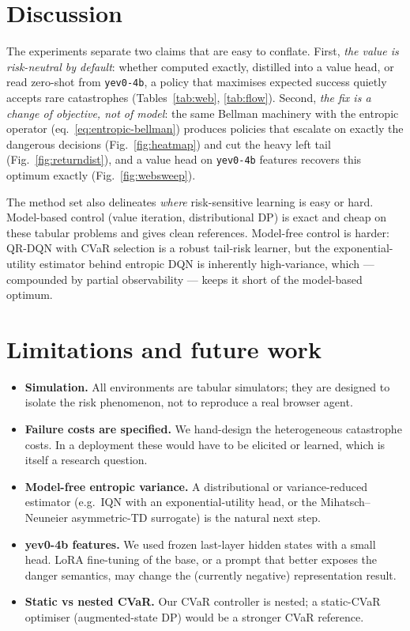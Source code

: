 \documentclass[11pt]{article}
\begin{document}
\section{Discussion}
The experiments separate two claims that are easy to conflate. First,
\emph{the value is risk-neutral by default}: whether computed exactly, distilled
into a value head, or read zero-shot from \texttt{yev0-4b}, a policy that maximises
expected success quietly accepts rare catastrophes (Tables~\ref{tab:web},
\ref{tab:flow}). Second, \emph{the fix is a change of objective, not of model}: the
same Bellman machinery with the entropic operator (eq.~\ref{eq:entropic-bellman})
produces policies that escalate on exactly the dangerous decisions
(Fig.~\ref{fig:heatmap}) and cut the heavy left tail (Fig.~\ref{fig:returndist}),
and a value head on \texttt{yev0-4b} features recovers this optimum exactly
(Fig.~\ref{fig:websweep}).

The method set also delineates \emph{where} risk-sensitive learning is easy or
hard. Model-based control (value iteration, distributional DP) is exact and cheap
on these tabular problems and gives clean references. Model-free control is harder:
QR-DQN with CVaR selection is a robust tail-risk learner, but the exponential-utility
estimator behind entropic DQN is inherently high-variance, which --- compounded by
partial observability --- keeps it short of the model-based optimum.

\section{Limitations and future work}
\begin{itemize}[nosep]
\item \textbf{Simulation.} All environments are tabular simulators; they are
  designed to isolate the risk phenomenon, not to reproduce a real browser agent.
\item \textbf{Failure costs are specified.} We hand-design the heterogeneous
  catastrophe costs. In a deployment these would have to be elicited or learned,
  which is itself a research question.
\item \textbf{Model-free entropic variance.} A distributional or
  variance-reduced estimator (e.g.\ IQN with an exponential-utility head, or the
  Mihatsch--Neuneier asymmetric-TD surrogate) is the natural next step.
\item \textbf{yev0-4b features.} We used frozen last-layer hidden states with a
  small head. LoRA fine-tuning of the base, or a prompt that better exposes the
  danger semantics, may change the (currently negative) representation result.
\item \textbf{Static vs nested CVaR.} Our CVaR controller is nested; a static-CVaR
  optimiser (augmented-state DP) would be a stronger CVaR reference.
\end{itemize}
\end{document}
